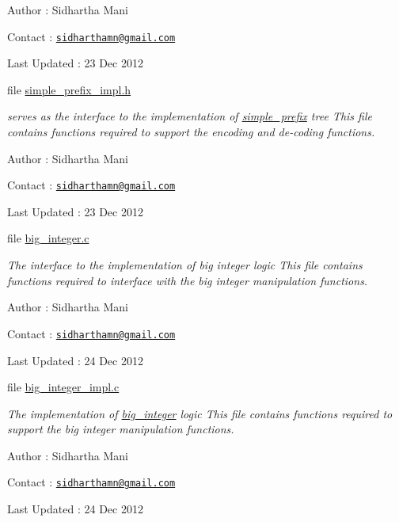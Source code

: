 \begin{DoxyCompactItemize}
\begin{DoxyCompactList}
 Author \-: Sidhartha Mani\par
 Contact \-: \href{mailto:sidharthamn@gmail.com}{\tt sidharthamn@gmail.\-com} \par
 Last Updated \-: 23 Dec 2012 \par
 \end{DoxyCompactList}\item 
file \hyperlink{simple__prefix__impl_8h}{simple\-\_\-prefix\-\_\-impl.\-h}
\begin{DoxyCompactList}\small\item\em serves as the interface to the implementation of \hyperlink{structsimple__prefix}{simple\-\_\-prefix} tree This file contains functions required to support the encoding and de-\/coding functions.\par
 Author \-: Sidhartha Mani\par
 Contact \-: \href{mailto:sidharthamn@gmail.com}{\tt sidharthamn@gmail.\-com} \par
 Last Updated \-: 23 Dec 2012 \par
 \end{DoxyCompactList}\item 
file \hyperlink{big__integer_8c}{big\-\_\-integer.\-c}
\begin{DoxyCompactList}\small\item\em The interface to the implementation of big integer logic This file contains functions required to interface with the big integer manipulation functions.\par
 Author \-: Sidhartha Mani\par
 Contact \-: \href{mailto:sidharthamn@gmail.com}{\tt sidharthamn@gmail.\-com} \par
 Last Updated \-: 24 Dec 2012 \par
 \end{DoxyCompactList}\item 
file \hyperlink{big__integer__impl_8c}{big\-\_\-integer\-\_\-impl.\-c}
\begin{DoxyCompactList}\small\item\em The implementation of \hyperlink{big__integer__impl_8h_structbig__integer}{big\-\_\-integer} logic This file contains functions required to support the big integer manipulation functions.\par
 Author \-: Sidhartha Mani\par
 Contact \-: \href{mailto:sidharthamn@gmail.com}{\tt sidharthamn@gmail.\-com} \par
 Last Updated \-: 24 Dec 2012 \par

\end{DoxyCompactList}
\end{DoxyCompactItemize}
